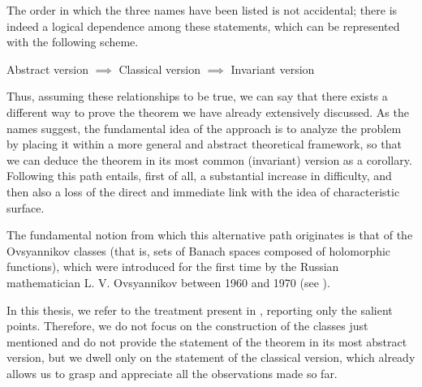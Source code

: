 The order in which the three names have been listed is not accidental; there is indeed a logical dependence among these statements, which can be represented with the following scheme.

\begin{center}
Abstract version $\implies$ Classical version $\implies$ Invariant version
\end{center}

Thus, assuming these relationships to be true, we can say that there exists a different way to prove the theorem we have already extensively discussed. As the names suggest, the fundamental idea of the approach is to analyze the problem by placing it within a more general and abstract theoretical framework, so that we can deduce the theorem in its most common (invariant) version as a corollary. Following this path entails, first of all, a substantial increase in difficulty, and then also a loss of the direct and immediate link with the idea of characteristic surface.

The fundamental notion from which this alternative path originates is that of the Ovsyannikov classes (that is, sets of Banach spaces composed of holomorphic functions), which were introduced for the first time by the Russian mathematician L. V. Ovsyannikov between 1960 and 1970 (see \cite{Ovsyannikov}).

In this thesis, we refer to the treatment present in \cite[cap.17-19]{Treves}, reporting only the salient points. Therefore, we do not focus on the construction of the classes just mentioned and do not provide the statement of the theorem in its most abstract version, but we dwell only on the statement of the classical version, which already allows us to grasp and appreciate all the observations made so far.

\begin{theorem}
\end{theorem}

